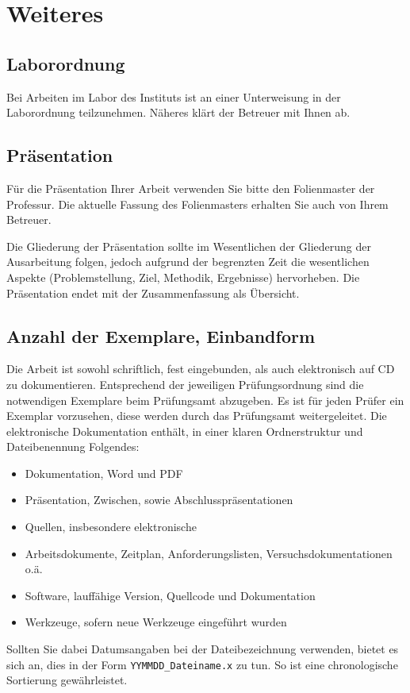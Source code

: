 \chapter{Weiteres}

\section{Laborordnung}
Bei Arbeiten im Labor des Instituts ist an einer Unterweisung in der Laborordnung teilzunehmen. Näheres klärt der Betreuer mit Ihnen ab.

\section{Präsentation}
Für die Präsentation Ihrer Arbeit verwenden Sie bitte den Folienmaster der Professur. Die aktuelle Fassung des Folienmasters erhalten Sie auch von Ihrem Betreuer.

Die Gliederung der Präsentation sollte im Wesentlichen der Gliederung der Ausarbeitung folgen, jedoch aufgrund der begrenzten Zeit die wesentlichen Aspekte (Problemstellung, Ziel, Methodik, Ergebnisse) hervorheben. 
Die Präsentation endet mit der Zusammenfassung als Übersicht.

\section{Anzahl der Exemplare, Einbandform}
Die Arbeit ist sowohl schriftlich, fest eingebunden, als auch elektronisch auf CD zu dokumentieren. Entsprechend der jeweiligen Prüfungsordnung sind die notwendigen Exemplare beim Prüfungsamt abzugeben. Es ist für jeden Prüfer ein Exemplar vorzusehen, diese werden durch das Prüfungsamt weitergeleitet.
Die elektronische Dokumentation enthält, in einer klaren Ordnerstruktur und Dateibenennung Folgendes:
\begin{itemize}
	\item Dokumentation, Word und PDF
	\item Präsentation, Zwischen, sowie Abschlusspräsentationen
	\item Quellen, insbesondere elektronische
	\item Arbeitsdokumente, Zeitplan, Anforderungslisten, Versuchsdokumentationen o.ä.
	\item Software, lauffähige Version, Quellcode und Dokumentation
	\item Werkzeuge, sofern neue Werkzeuge eingeführt wurden
\end{itemize}
Sollten Sie dabei Datumsangaben bei der Dateibezeichnung verwenden, bietet es sich an, dies in der Form \verb|YYMMDD_Dateiname.x| zu tun. So ist eine chronologische Sortierung gewährleistet.